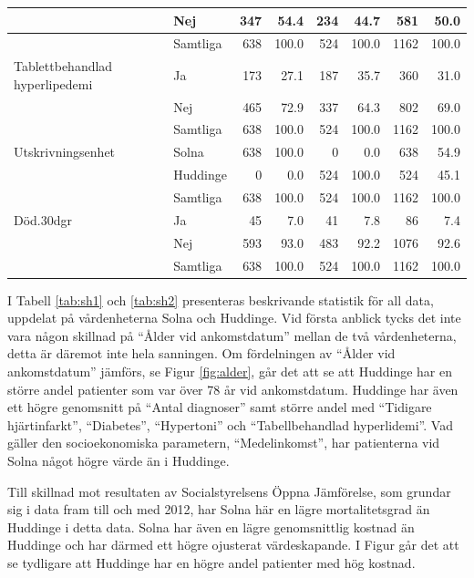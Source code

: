 \begin{table}[htbp]
{\begin{tabular}{ll|rr|rr|rr}
   & Nej & 347 & 54.4 & 234 & 44.7 & 581 & 50.0 \\ 
   \hline
 & Samtliga & 638 & 100.0 & 524 & 100.0 & 1162 & 100.0 \\ 
   \hline
\hline
Tablettbehandlad hyperlipedemi & Ja & 173 & 27.1 & 187 & 35.7 & 360 & 31.0 \\ 
   & Nej & 465 & 72.9 & 337 & 64.3 & 802 & 69.0 \\ 
   \hline
 & Samtliga & 638 & 100.0 & 524 & 100.0 & 1162 & 100.0 \\ 
   \hline
\hline
Utskrivningsenhet & Solna & 638 & 100.0 & 0 & 0.0 & 638 & 54.9 \\ 
   & Huddinge & 0 & 0.0 & 524 & 100.0 & 524 & 45.1 \\ 
   \hline
 & Samtliga & 638 & 100.0 & 524 & 100.0 & 1162 & 100.0 \\ 
   \hline
\hline
Död.30dgr & Ja & 45 & 7.0 & 41 & 7.8 & 86 & 7.4 \\ 
   & Nej & 593 & 93.0 & 483 & 92.2 & 1076 & 92.6 \\ 
   \hline
 & Samtliga & 638 & 100.0 & 524 & 100.0 & 1162 & 100.0 \\ 
   \hline
\hline
\end{tabular}
}

\end{table}

\newpage

I Tabell \ref{tab:sh1} och \ref{tab:sh2} presenteras beskrivande statistik för all data, uppdelat på vårdenheterna Solna och Huddinge. Vid första anblick tycks det inte vara någon skillnad på “Ålder vid ankomstdatum” mellan de två vårdenheterna, detta är däremot inte hela sanningen. Om fördelningen av “Ålder vid ankomstdatum” jämförs, se Figur \ref{fig:alder}, går det att se att Huddinge har en större andel patienter som var över 78 år vid ankomstdatum. Huddinge har även ett högre genomsnitt på “Antal diagnoser” samt större andel med “Tidigare hjärtinfarkt”, “Diabetes”, “Hypertoni” och “Tabellbehandlad hyperlidemi”. Vad gäller den socioekonomiska parametern, ``Medelinkomst'', har patienterna vid Solna något högre värde än i Huddinge.

Till skillnad mot resultaten av Socialstyrelsens Öppna Jämförelse, som grundar sig i data fram till och med 2012, har Solna här en lägre mortalitetsgrad än Huddinge i detta data. Solna har även en lägre genomsnittlig kostnad än Huddinge och har därmed ett högre ojusterat värdeskapande. I Figur \label{fig:kostnad} går det att se tydligare att Huddinge har en högre andel patienter med hög kostnad.


